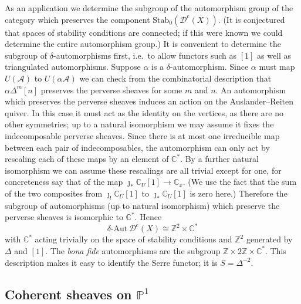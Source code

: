 \documentclass{article}
\theoremstyle{plain}
\theoremstyle{definition}
\theoremstyle{remark}
\newcommand{\ie}{i.e.\ }
\newcommand{\Z}{\mathbb{Z}}
\newcommand{\C}{\mathbb{C}}
\renewcommand{\P}{\mathbb{P}}
\newcommand{\cat}[1]{\mathcal{#1}}
\newcommand{\constr}[1]{\cat{D}^\textrm{c}(#1)}
\newcommand{\stabo}[1]{\mathrm{Stab}_0(#1)}
\begin{document}
As an application we determine the subgroup of the automorphism group of the category which preserves the component $\stabo{\constr{X}}$. (It is conjectured that spaces of stability conditions are connected; if this were known we could determine the entire automorphism group.) It is convenient to determine the subgroup of $\delta$-automorphisms first, \ie to allow functors such as $[1]$ as well as triangulated automorphisms. Suppose $\alpha$ is a $\delta$-automorphism. Since $\alpha$ must map $U(\cat{A})$ to $U(\alpha\cat{A})$ we can check from the combinatorial description that $\alpha\Delta^m[n]$ preserves the perverse sheaves for some $m$ and $n$. An automorphism which preserves the perverse sheaves induces an action on the Auslander--Reiten quiver. In this case it must act as the identity on the vertices, as there are no other symmetries; up to a natural isomorphism we may assume it fixes the indecomposable perverse sheaves. Since there is at most one irreducible map between each pair of indecomposables, the automorphism can only act by rescaling each of these maps by an element of $\C^*$. By a further natural isomorphism we can assume these rescalings are all trivial except for one, for concreteness say that of the map $\jmath_*\C_U[1] \to \C_x$. (We use the fact that the sum of the two composites from $\jmath_!\C_U[1]$ to $\jmath_*\C_U[1]$ is zero here.) Therefore the subgroup of automorphisms (up to natural isomorphism) which preserve the perverse sheaves is isomorphic to $\C^*$. Hence 
$$
\textrm{$\delta$-Aut}\, \constr{X} \cong \Z^2 \times \C^*
$$
with $\C^*$ acting trivially on the space of stability conditions and $\Z^2$ generated by $\Delta$ and $[1]$. The {\it bona fide} automorphisms are the subgroup $\Z \times 2\Z \times \C^*$. This description makes it easy to identify the Serre functor; it is $S= \Delta^{-2}$.


\subsection{Coherent sheaves on $\P^1$}
\label{coherent}
\end{document}
